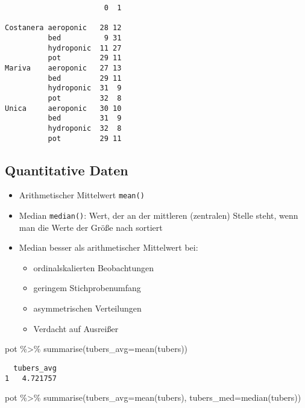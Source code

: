 \documentclass[
  letterpaper,
  DIV=11,
  numbers=noendperiod]{scrartcl}
\newenvironment{Shaded}{\begin{snugshade}}{\end{snugshade}}
\newcommand{\AttributeTok}[1]{\textcolor[rgb]{0.40,0.45,0.13}{#1}}
\newcommand{\FunctionTok}[1]{\textcolor[rgb]{0.28,0.35,0.67}{#1}}
\newcommand{\NormalTok}[1]{\textcolor[rgb]{0.00,0.23,0.31}{#1}}
\newcommand{\SpecialCharTok}[1]{\textcolor[rgb]{0.37,0.37,0.37}{#1}}
\providecommand{\tightlist}{%
  \setlength{\itemsep}{0pt}\setlength{\parskip}{0pt}}\usepackage{longtable,booktabs,array}
\begin{document}
\begin{verbatim}
                       0  1
                           
Costanera aeroponic   28 12
          bed          9 31
          hydroponic  11 27
          pot         29 11
Mariva    aeroponic   27 13
          bed         29 11
          hydroponic  31  9
          pot         32  8
Unica     aeroponic   30 10
          bed         31  9
          hydroponic  32  8
          pot         29 11
\end{verbatim}

\hypertarget{quantitative-daten}{%
\subsection{Quantitative Daten}\label{quantitative-daten}}

\begin{itemize}
\tightlist
\item
  Arithmetischer Mittelwert \texttt{mean()}
\item
  Median \texttt{median()}: Wert, der an der mittleren (zentralen)
  Stelle steht, wenn man die Werte der Größe nach sortiert
\item
  Median besser als arithmetischer Mittelwert bei:

  \begin{itemize}
  \tightlist
  \item
    ordinalskalierten Beobachtungen
  \item
    geringem Stichprobenumfang
  \item
    asymmetrischen Verteilungen
  \item
    Verdacht auf Ausreißer
  \end{itemize}
\end{itemize}

\begin{Shaded}
\begin{Highlighting}[]
\NormalTok{pot }\SpecialCharTok{\%\textgreater{}\%} 
  \FunctionTok{summarise}\NormalTok{(}\AttributeTok{tubers\_avg=}\FunctionTok{mean}\NormalTok{(tubers))}
\end{Highlighting}
\end{Shaded}

\begin{verbatim}
  tubers_avg
1   4.721757
\end{verbatim}

\begin{Shaded}
\begin{Highlighting}[]
\NormalTok{pot }\SpecialCharTok{\%\textgreater{}\%} 
  \FunctionTok{summarise}\NormalTok{(}\AttributeTok{tubers\_avg=}\FunctionTok{mean}\NormalTok{(tubers),}
            \AttributeTok{tubers\_med=}\FunctionTok{median}\NormalTok{(tubers))}
\end{Highlighting}
\end{Shaded}
\end{document}
